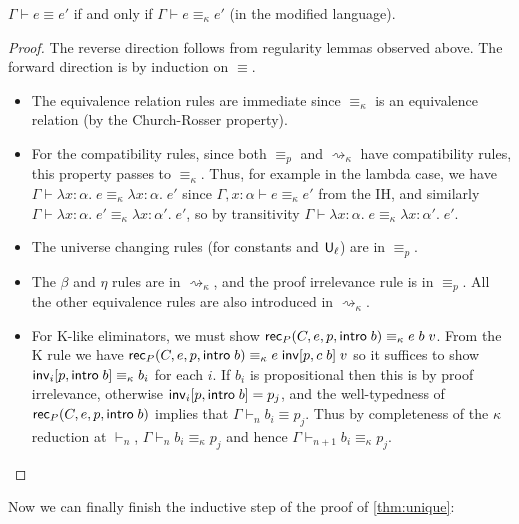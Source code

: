 \begin{theorem}\label{thm:ckappa}
$\Gamma\vdash e\equiv e'$ if and only if $\Gamma\vdash e\equiv_\kappa e'$ (in the modified language).
\end{theorem}
\begin{proof}
The reverse direction follows from regularity lemmas observed above. The forward direction is by induction on $\equiv$.
\begin{itemize}
\item The equivalence relation rules are immediate since $\equiv_\kappa$ is an equivalence relation (by the Church-Rosser property).
\item For the compatibility rules, since both $\equiv_p$ and $\rightsquigarrow_\kappa$ have compatibility rules, this property passes to $\equiv_\kappa$. Thus, for example in the lambda case, we have $\Gamma\vdash\lambda x:\alpha.\;e\equiv_\kappa\lambda x:\alpha.\;e'$ since $\Gamma,x:\alpha\vdash e\equiv_\kappa e'$ from the IH, and similarly $\Gamma\vdash\lambda x:\alpha.\;e'\equiv_\kappa\lambda x:\alpha'.\;e'$, so by transitivity $\Gamma\vdash\lambda x:\alpha.\;e\equiv_\kappa\lambda x:\alpha'.\;e'$.
\item The universe changing rules (for constants and $\mathsf{U}_\ell$) are in $\equiv_p$.
\item The $\beta$ and $\eta$ rules are in $\rightsquigarrow_\kappa$, and the proof irrelevance rule is in $\equiv_p$. All the other equivalence rules are also introduced in $\rightsquigarrow_\kappa$.
\item For K-like eliminators, we must show $\mathsf{rec}_P(C,e,p,\mathsf{intro}\;b)\equiv_\kappa e\;b\;v$. From the K rule we have $\mathsf{rec}_P(C,e,p,\mathsf{intro}\;b)\equiv_\kappa e\;\mathsf{inv}[p,c\;b]\;v$ so it suffices to show $\mathsf{inv}_i[p,\mathsf{intro}\;b]\equiv_\kappa b_i$ for each $i$. If $b_i$ is propositional then this is by proof irrelevance, otherwise $\mathsf{inv}_i[p,\mathsf{intro}\;b]=p_j$, and the well-typedness of $\mathsf{rec}_P(C,e,p,\mathsf{intro}\;b)$ implies that $\Gamma\vdash_n b_i\equiv p_j$. Thus by completeness of the $\kappa$ reduction at $\vdash_n$, $\Gamma\vdash_n b_i\equiv_\kappa p_j$ and hence $\Gamma\vdash_{n+1} b_i\equiv_\kappa p_j$.
\end{itemize}
\end{proof}

Now we can finally finish the inductive step of the proof of \autoref{thm:unique}:

